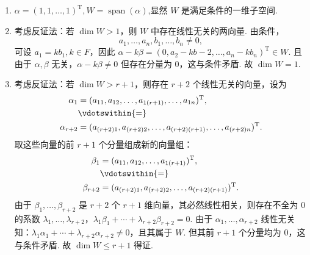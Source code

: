 \documentclass[12pt,fontset=fandol]{ctexart}
\begin{document}
\begin{solve}
\begin{enumerate}
                \item $\alpha=(1,1,\ldots,1)^{\mathrm{T}}, W=\operatorname{span}(\alpha)$,显然 $W$ 是满足条件的一维子空间.

                \item 考虑反证法：若 $\dim W>1$，则 $W$ 中存在线性无关的两向量. 由条件，
                      \[a_1,\ldots,a_n,b_1,\ldots,b_n\neq 0,\]
                      可设 $a_1=kb_1,k\in F$，因此 $\alpha-k\beta=(0,a_2-kb-2,\ldots,a_n-kb_n)^{\mathrm{T}}\in W$. 且由于 $\alpha,\beta$ 无关，$\alpha-k\beta\neq 0$ 但存在分量为 0，这与条件矛盾. 故 $\dim W=1$.

                \item 考虑反证法：若 $\dim W>r+1$，则存在 $r+2$ 个线性无关的向量，设为
                      \begin{align*}
                          \alpha_1     & = (a_{11},a_{12},\ldots,a_{1(r+1)},\ldots,a_{1n})^{\mathrm{T}},                 \\
                                       & \vdotswithin{ = }                                                              \\
                          \alpha_{r+2} & = (a_{(r+2)1},a_{(r+2)2},\ldots,a_{(r+2)(r+1)},\ldots,a_{(r+2)n})^{\mathrm{T}}.
                      \end{align*}
                      取这些向量的前 $r+1$ 个分量组成新的向量组：
                      \begin{align*}
                          \beta_1     & = (a_{11},a_{12},\ldots,a_{1(r+1)})^{\mathrm{T}},             \\
                                      & \vdotswithin{ = }                                            \\
                          \beta_{r+2} & = (a_{(r+2)1},a_{(r+2)2},\ldots,a_{(r+2)(r+1)})^{\mathrm{T}}.
                      \end{align*}
                      由于 $\beta_1,\ldots,\beta_{r+2}$ 是 $r+2$ 个 $r+1$ 维向量，其必然线性相关，则存在不全为 0 的系数 $\lambda_1,\ldots,\lambda_{r+2}$，$\lambda_1\beta_1+\cdots+\lambda_{r+2}\beta_{r+2}=0$.  由于 $\alpha_1,\ldots,\alpha_{r+2}$ 线性无关知：$\lambda_1\alpha_1+\cdots+\lambda_{r+2}\alpha_{r+2}\neq 0$，且其属于 $W$. 但其前 $r+1$ 个分量均为 0，这与条件矛盾. 故 $\dim W\leqslant r+1$ 得证.
            \end{enumerate}
\end{solve}
\end{document}

